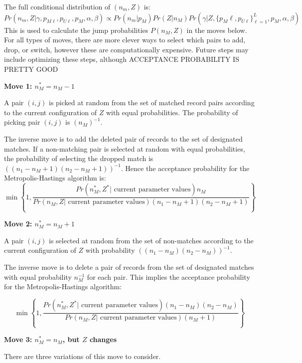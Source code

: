 \documentclass[11pt,reqno]{amsart}
\begin{document}
The full conditional distribution of $(n_m, Z)$ is:
\begin{equation} 
Pr\left(n_m, Z | \gamma, p_{M\ell}, p_{U\ell}, p_M, \alpha, \beta \right) \propto Pr(n_m | p_M) Pr(Z | n_M) Pr\left(\gamma | Z,  \{p_M{\ell}, p_{U\ell}\}_{\ell=1}^L, p_M, \alpha, \beta \right) \label{nmZ} \end{equation}
This is used to calculate the jump probabilities $P(n_M, Z) $ in the moves below.  For all types of moves, there are more clever ways to select which pairs to add, drop, or switch, however these are computationally expensive.  Future steps may include optimizing these steps, although ACCEPTANCE PROBABILITY IS PRETTY GOOD %

\textbf{Move 1: $n_M^* = n_M - 1 $ }

A pair $(i,j)$ is picked at random from the set of matched record pairs according to the current configuration of $Z$ with equal probabilities.  The probability of picking pair $(i,j)$ is $(n_M)^{-1}$. 

The inverse move is to add the deleted pair of records to the set of designated matches.  If a non-matching pair is selected at random with equal probabilities, the probability of selecting the dropped match is $\left((n_1 - n_M + 1)(n_2 - n_M + 1)\right)^{-1}$.  Hence the acceptance probability for the Metropolis-Hastings algorithm is:
\[ \min \left\{ 1, \frac{Pr\left(n_M^*, Z^* | \text{ current parameter values}\right)  n_M}{Pr\left(n_M, Z | \text{ current parameter values}\right) (n_1 - n_M + 1)(n_2 - n_M + 1)}\right\} \] 

\textbf{Move 2: $n_M^* = n_M + 1 $ }

A pair $(i,j)$ is selected at random from the set of non-matches according to the current configuration of $Z$ with probability $\left((n_1-n_M)(n_2-n_M)\right)^{-1}$.  

The inverse move is to delete a pair of records from the set of designated matches with equal probability $n_M^{-1}$ for each pair.  This implies the acceptance probability for the Metropolis-Hastings algorithm:

\[ \min \left\{ 1, \frac{Pr\left(n_M^*, Z^* | \text{ current parameter values}\right)(n_1 - n_M)(n_2 - n_M)}{Pr\left(n_M, Z | \text{ current parameter values}\right)(n_M + 1)} \right\} \] 

\textbf{Move 3: $n_M^* = n_M$, but $Z$ changes} 

There are three variations of this move to consider. 
\end{document}
